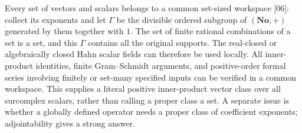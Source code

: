 \documentclass[11pt,letterpaper]{article}
\numberwithin{equation}{section}
\theoremstyle{definition}
\theoremstyle{remark}
\newcommand{\No}{\mathbf{No}}
\newcommand{\src}[1]{\textup{\textsf{\small[#1]}}}
\begin{document}
Every set of vectors and scalars belongs to a common set-sized workspace
\src{06}: collect its exponents and let $\Gamma$ be the divisible ordered
subgroup of $(\No,+)$ generated by them together with $1$. The set of finite
rational combinations of a set is a set, and this $\Gamma$ contains all the
original supports. The real-closed or algebraically closed Hahn scalar fields
can therefore be used locally. All inner-product identities, finite
Gram--Schmidt arguments, and positive-order formal series involving finitely
or set-many specified inputs can be verified in a common workspace. This
supplies a literal positive inner-product vector class over all surcomplex
scalars, rather than calling a proper class a set. A separate issue is
whether a globally defined operator needs a proper class of coefficient
exponents; adjointability gives a strong answer.
\end{document}
